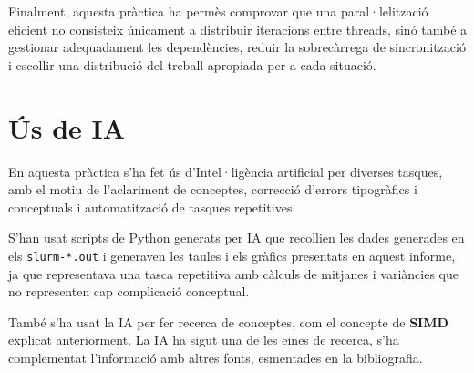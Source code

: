 \documentclass{article}
\begin{document}
\bigskip

\noindent Finalment, aquesta pràctica ha permès comprovar que una paral·lelització eficient no consisteix únicament a distribuir iteracions entre threads, sinó també a gestionar adequadament les dependències, reduir la sobrecàrrega de sincronització i escollir una distribució del treball apropiada per a cada situació.


\newpage
\section{Ús de IA}

En aquesta pràctica s'ha fet ús d'Intel·ligència artificial per diverses tasques, amb el motiu de l'aclariment de conceptes, correcció d'errors tipogràfics i conceptuals i automatització de tasques repetitives.

S'han usat scripts de Python generats per IA que recollien les dades generades en els \texttt{slurm-*.out} i generaven les taules i els gràfics presentats en aquest informe, ja que representava una tasca repetitiva amb càlculs de mitjanes i variàncies que no representen cap complicació conceptual.

També s'ha usat la IA per fer recerca de conceptes, com el concepte de \textbf{SIMD} explicat anteriorment. La IA ha sigut una de les eines de recerca, s'ha complementat l'informació amb altres fonts, esmentades en la bibliografia.

\newpage
\nocite{wiki_simd, openmp_refguides}   %


\end{document}
